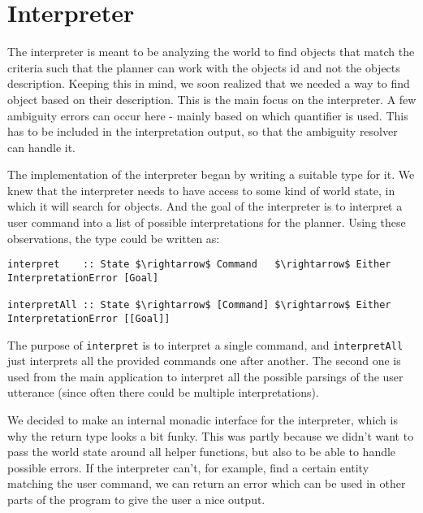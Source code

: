 \section*{Interpreter}

The interpreter is meant to be analyzing the world to find objects that match the criteria such that the planner can work with the objects id and not the objects description.
Keeping this in mind, we soon realized that we needed a way to find object based on their description.
This is the main focus on the interpreter.
A few ambiguity errors can occur here - mainly based on which quantifier is used.
This has to be included in the interpretation output, so that the ambiguity resolver can handle it.

The implementation of the interpreter began by writing a suitable type for it.
We knew that the interpreter needs to have access to some kind of world state, in which it will search for objects.
And the goal of the interpreter is to interpret a user command into a list of possible interpretations for the planner.
Using these observations, the type could be written as:

\begin{lstlisting}
interpret    :: State $\rightarrow$ Command   $\rightarrow$ Either InterpretationError [Goal]

interpretAll :: State $\rightarrow$ [Command] $\rightarrow$ Either InterpretationError [[Goal]]
\end{lstlisting}

The purpose of \verb|interpret| is to interpret a single command, and \verb|interpretAll| just interprets all the provided commands one after another. The second one is used from the main application to interpret all the possible parsings of the user utterance (since often there could be multiple interpretations).

We decided to make an internal monadic interface for the interpreter, which is why the return type looks a bit funky.
This was partly because we didn't want to pass the world state around all helper functions, but also to be able to handle possible errors.
If the interpreter can't, for example, find a certain entity matching the user command, we can return an error which can be used in other parts of the program to give the user a nice output.

